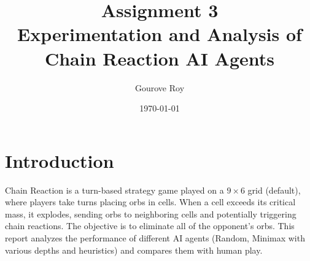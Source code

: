 \documentclass[11pt,a4paper]{article}
\title{Assignment 3 \\ Experimentation and Analysis of Chain Reaction AI Agents}
\author{Gourove Roy}
\date{\today}
\begin{document}
\maketitle

\section{Introduction}
Chain Reaction is a turn-based strategy game played on a $9\times6$ grid (default), where players take turns placing orbs in cells. When a cell exceeds its critical mass, it explodes, sending orbs to neighboring cells and potentially triggering chain reactions. The objective is to eliminate all of the opponent's orbs. This report analyzes the performance of different AI agents (Random, Minimax with various depths and heuristics) and compares them with human play.
\end{document}
